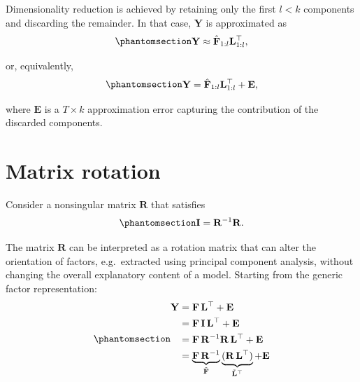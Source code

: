 \documentclass[
  letterpaper,
  DIV=11,
  numbers=noendperiod]{scrreprt}
\begin{document}
Dimensionality reduction is achieved by retaining only the first \(l<k\)
components and discarding the remainder. In that case, \(\mathbf{Y}\) is
approximated as
\begin{equation}\protect\phantomsection\label{eq-gen-0062}{  
\begin{align}
    \mathbf{Y} \approx \hat{\mathbf{F}}_{1:l}\mathbf{L}_{1:l}^{\top},
\end{align}
}\end{equation}

or, equivalently,
\begin{equation}\protect\phantomsection\label{eq-gen-0063}{  
\begin{align}
    \mathbf{Y} = \hat{\mathbf{F}}_{1:l}\mathbf{L}_{1:l}^{\top} + \mathbf{E},
\end{align}
}\end{equation}

where \(\mathbf{E}\) is a \(T\times k\) approximation error capturing
the contribution of the discarded components.

\section{Matrix rotation}\label{matrix-rotation}

Consider a nonsingular matrix \(\mathbf{R}\) that satisfies
\begin{equation}\protect\phantomsection\label{eq-gen-0064}{  
\begin{align}
    \mathbf{I} = \mathbf{R}^{-1} \mathbf{R}.
\end{align}
}\end{equation}

The matrix \(\mathbf{R}\) can be interpreted as a rotation matrix that
can alter the orientation of factors, e.g.~extracted using principal
component analysis, without changing the overall explanatory content of
a model. Starting from the generic factor representation:
\begin{equation}\protect\phantomsection\label{eq-gen-0065}{  
\begin{align}
    \mathbf{Y} &= \mathbf{F} \, \mathbf{L}^{\top} + \mathbf{E} \nonumber \\
    &= \mathbf{F} \, \mathbf{I} \, \mathbf{L}^{\top} + \mathbf{E} \nonumber \\
    &= \mathbf{F} \, \mathbf{R}^{-1}\mathbf{R} \,\mathbf{L}^{\top} + \mathbf{E} \nonumber \\   
    &= \underbrace{\mathbf{F} \, \mathbf{R}^{-1}}_{\tilde{\mathbf{F}}}
        \underbrace{(\mathbf{R} \, \mathbf{L}^{\top})}_{\tilde{\mathbf{L}}^{\top}} + \mathbf{E}
\end{align}
}\end{equation}
\end{document}
